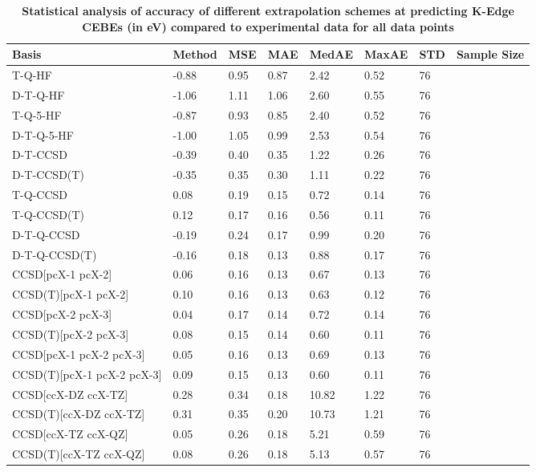 \begin{table}
  \caption{\textbf{Statistical analysis of accuracy of different extrapolation schemes at predicting K-Edge CEBEs (in eV) compared to experimental data for all data points}}
  \label{tbl:extrap-all-summary}
  \begin{tabular}{l l l l l l l l }
    \toprule
    \textbf{Basis} & \textbf{Method} & \textbf{MSE} & \textbf{MAE} & \textbf{MedAE} & \textbf{MaxAE} & \textbf{STD} & \textbf{Sample Size} \\ 
    \midrule
    T-Q-HF & -0.88 & 0.95 & 0.87 & 2.42 & 0.52 & 76 \\ 
    D-T-Q-HF & -1.06 & 1.11 & 1.06 & 2.60 & 0.55 & 76 \\ 
    T-Q-5-HF & -0.87 & 0.93 & 0.85 & 2.40 & 0.52 & 76 \\ 
    D-T-Q-5-HF & -1.00 & 1.05 & 0.99 & 2.53 & 0.54 & 76 \\ 
    D-T-CCSD & -0.39 & 0.40 & 0.35 & 1.22 & 0.26 & 76 \\ 
    D-T-CCSD(T) & -0.35 & 0.35 & 0.30 & 1.11 & 0.22 & 76 \\ 
    T-Q-CCSD & 0.08 & 0.19 & 0.15 & 0.72 & 0.14 & 76 \\ 
    T-Q-CCSD(T) & 0.12 & 0.17 & 0.16 & 0.56 & 0.11 & 76 \\ 
    D-T-Q-CCSD & -0.19 & 0.24 & 0.17 & 0.99 & 0.20 & 76 \\ 
    D-T-Q-CCSD(T) & -0.16 & 0.18 & 0.13 & 0.88 & 0.17 & 76 \\ 
    CCSD[pcX-1 pcX-2] & 0.06 & 0.16 & 0.13 & 0.67 & 0.13 & 76 \\ 
    CCSD(T)[pcX-1 pcX-2] & 0.10 & 0.16 & 0.13 & 0.63 & 0.12 & 76 \\ 
    CCSD[pcX-2 pcX-3] & 0.04 & 0.17 & 0.14 & 0.72 & 0.14 & 76 \\ 
    CCSD(T)[pcX-2 pcX-3] & 0.08 & 0.15 & 0.14 & 0.60 & 0.11 & 76 \\ 
    CCSD[pcX-1 pcX-2 pcX-3] & 0.05 & 0.16 & 0.13 & 0.69 & 0.13 & 76 \\ 
    CCSD(T)[pcX-1 pcX-2 pcX-3] & 0.09 & 0.15 & 0.13 & 0.60 & 0.11 & 76 \\ 
    CCSD[ccX-DZ ccX-TZ] & 0.28 & 0.34 & 0.18 & 10.82 & 1.22 & 76 \\ 
    CCSD(T)[ccX-DZ ccX-TZ] & 0.31 & 0.35 & 0.20 & 10.73 & 1.21 & 76 \\ 
    CCSD[ccX-TZ ccX-QZ] & 0.05 & 0.26 & 0.18 & 5.21 & 0.59 & 76 \\ 
    CCSD(T)[ccX-TZ ccX-QZ] & 0.08 & 0.26 & 0.18 & 5.13 & 0.57 & 76 \\ 

\end{tabular}
\end{table}
